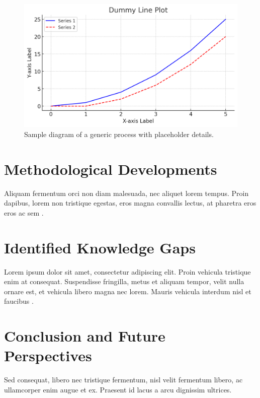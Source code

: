 \begin{figure}[h!]
    \centering
    \includegraphics[width=130mm,scale=0.6]{body/images/placeholder_image1.png}
    \caption[Sample Diagram of a Generic Process]{Sample diagram of a generic process with placeholder details.}
    \label{fig:sample_figure}
\end{figure}

\section{Methodological Developments}
Aliquam fermentum orci non diam malesuada, nec aliquet lorem tempus. Proin dapibus, lorem non tristique egestas, eros magna convallis lectus, at pharetra eros eros ac sem \citep{sample_reference3}.

\section{Identified Knowledge Gaps}
Lorem ipsum dolor sit amet, consectetur adipiscing elit. Proin vehicula tristique enim at consequat. Suspendisse fringilla, metus et aliquam tempor, velit nulla ornare est, et vehicula libero magna nec lorem. Mauris vehicula interdum nisl et faucibus \citep{sample_reference4}. 

\section{Conclusion and Future Perspectives}
Sed consequat, libero nec tristique fermentum, nisl velit fermentum libero, ac ullamcorper enim augue et ex. Praesent id lacus a arcu dignissim ultrices. 

